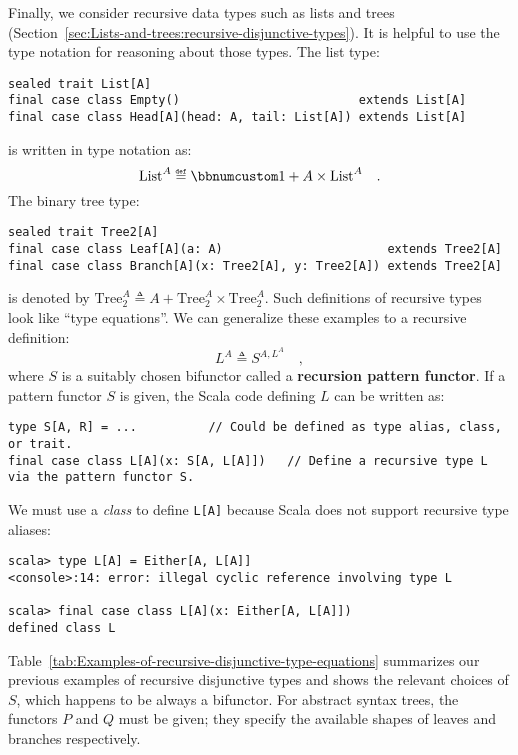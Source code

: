 Finally, we consider recursive data types such as lists and trees
(Section~\ref{sec:Lists-and-trees:recursive-disjunctive-types}).
It is helpful to use the type notation for reasoning about those types.
The list type:
\begin{lstlisting}
sealed trait List[A]
final case class Empty()                         extends List[A]
final case class Head[A](head: A, tail: List[A]) extends List[A]
\end{lstlisting}
is written in type notation as:
\[
\text{List}^{A}\triangleq\bbnum 1+A\times\text{List}^{A}\quad.
\]
The binary tree type:
\begin{lstlisting}
sealed trait Tree2[A]
final case class Leaf[A](a: A)                       extends Tree2[A]
final case class Branch[A](x: Tree2[A], y: Tree2[A]) extends Tree2[A]
\end{lstlisting}
is denoted by $\text{Tree}_{2}^{A}\triangleq A+\text{Tree}_{2}^{A}\times\text{Tree}_{2}^{A}$.
Such definitions of recursive types look like \textsf{``}type equations\textsf{''}.
We can generalize these examples to a recursive definition:
\begin{equation}
L^{A}\triangleq S^{A,L^{A}}\quad,\label{eq:f-def-recursive-functor}
\end{equation}
where $S$ is a suitably chosen bifunctor called a \textbf{recursion
pattern functor}. If a pattern functor $S$ is given, the Scala code
defining $L$ can be written as:
\begin{lstlisting}
type S[A, R] = ...          // Could be defined as type alias, class, or trait.
final case class L[A](x: S[A, L[A]])   // Define a recursive type L via the pattern functor S.
\end{lstlisting}
We must use a \emph{class} to define \lstinline!L[A]! because Scala
does not support recursive type aliases:
\begin{lstlisting}
scala> type L[A] = Either[A, L[A]]
<console>:14: error: illegal cyclic reference involving type L

scala> final case class L[A](x: Either[A, L[A]])
defined class L
\end{lstlisting}

Table~\ref{tab:Examples-of-recursive-disjunctive-type-equations}
summarizes our previous examples of recursive disjunctive types and
shows the relevant choices of $S$, which happens to be always a bifunctor.
For abstract syntax trees, the functors $P$ and $Q$ must be given;
they specify the available shapes of leaves and branches respectively. 

